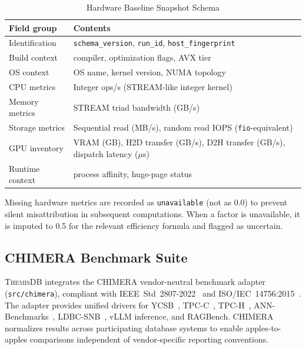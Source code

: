 \documentclass[conference]{IEEEtran}
\newcommand{\themis}{\textsc{ThemisDB}}
\begin{document}
\begin{table}[t]
  \caption{Hardware Baseline Snapshot Schema}
  \label{tab:hw-schema}
  \centering
  \begin{tabular}{L{2.0cm}L{5.5cm}}
    \toprule
    \textbf{Field group} & \textbf{Contents} \\
    \midrule
    Identification &
      \texttt{schema\_version}, \texttt{run\_id},
      \texttt{host\_fingerprint} \\
    Build context &
      compiler, optimization flags, AVX tier \\
    OS context &
      OS name, kernel version, NUMA topology \\
    CPU metrics &
      Integer ops/s (STREAM-like integer kernel) \\
    Memory metrics &
      STREAM triad bandwidth (GB/s) \\
    Storage metrics &
      Sequential read (MB/s), random read IOPS
      (\texttt{fio}-equivalent) \\
    GPU inventory &
      VRAM (GB), H2D transfer (GB/s), D2H transfer (GB/s),
      dispatch latency ($\mu$s) \\
    Runtime context &
      process affinity, huge-page status \\
    \bottomrule
  \end{tabular}
\end{table}

Missing hardware metrics are recorded as \texttt{unavailable} (not
as 0.0) to prevent silent misattribution in subsequent computations.
When a factor is unavailable, it is imputed to 0.5 for the relevant
efficiency formula and flagged as uncertain.

\subsection{CHIMERA Benchmark Suite}
\label{ssec:chimera}

\themis{} integrates the CHIMERA vendor-neutral benchmark adapter
(\texttt{src/chimera}), compliant with IEEE~Std~2807-2022~\cite{IEEE2807}
and ISO/IEC~14756:2015~\cite{ISO14756}.
The adapter provides unified drivers for YCSB~\cite{Cooper2010},
TPC-C~\cite{TPCC}, TPC-H~\cite{TPCH}, ANN-Benchmarks~\cite{AnnBenchmarks},
LDBC-SNB~\cite{Angles2018,LDBCSNB}, vLLM inference, and RAGBench.
CHIMERA normalizes results across participating database systems to
enable apples-to-apples comparisons independent of vendor-specific
reporting conventions.
\end{document}
